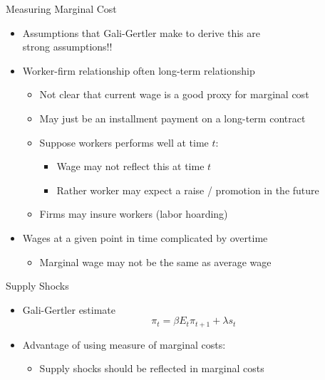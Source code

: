 \documentclass[10pt]{beamer}
\begin{document}
\begin{frame}{Measuring Marginal Cost}
\begin{itemize}
\itemsep1em 
\item  Assumptions that Gali-Gertler make to derive this are \\ strong assumptions!!
\item Worker-firm relationship often long-term relationship
\begin{itemize}
\item Not clear that current wage is a good proxy for marginal cost
\item May just be an installment payment on a long-term contract
\item Suppose workers performs well at time $t$:
\begin{itemize}
\item  Wage may not reflect this at time $t$
\item Rather worker may expect a raise / promotion in the future
\end{itemize}
\item Firms may insure workers (labor hoarding)
\end{itemize}
\item Wages at a given point in time complicated by overtime 
\begin{itemize}
\item Marginal wage may not be the same as average wage
\end{itemize}
\end{itemize}
\end{frame}

\begin{frame}{Supply Shocks}
\begin{itemize}
\itemsep1em 
\item Gali-Gertler estimate
\[ \pi_{t} = \beta E_{t} \pi_{t+1} + \lambda s_{t} \]
\item Advantage of using measure of marginal costs:
\begin{itemize}
\item Supply shocks should be reflected in marginal costs
\end{itemize}
\end{itemize}
\end{frame}
\end{document}
